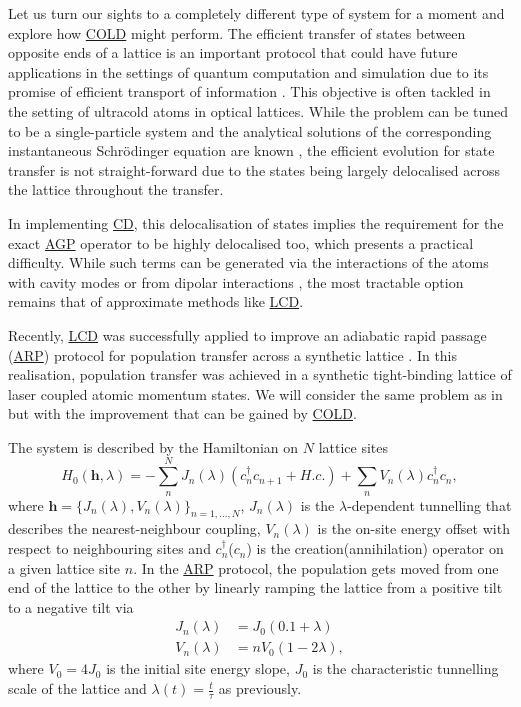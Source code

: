 \documentclass[a4paper,oneside,11pt]{book}
\newcommand{\hbb}{\boldsymbol{h}}
\newcommand{\acrref}[1]{\hyperref[acr:#1]{#1}}
\begin{document}
Let us turn our sights to a completely different type of system for a moment and explore how \acrref{COLD} might perform. The efficient transfer of states between opposite ends of a lattice is an important protocol that could have future applications in the settings of quantum computation and simulation due to its promise of efficient transport of information \cite{lang_topological_2017}. This objective is often tackled in the setting of ultracold atoms in optical lattices. While the problem can be tuned to be a single-particle system and the analytical solutions of the corresponding instantaneous Schr\"odinger equation are known \cite{hatsugai_chern_1993,hugel_chiral_2014}, the efficient evolution for state transfer is not straight-forward due to the states being largely delocalised across the lattice throughout the transfer. 

In implementing \acrref{CD}, this delocalisation of states implies the requirement for the exact \acrref{AGP} operator to be highly delocalised too, which presents a practical difficulty. While such terms can be generated via the interactions of the atoms with cavity modes \cite{landig_quantum_2016,keller_phases_2017} or from dipolar interactions \cite{baranov_ultracold_2002, trefzger_ultracold_2011}, the most tractable option remains that of approximate methods like \acrref{LCD}.

Recently, \acrref{LCD} was successfully applied to improve an adiabatic rapid passage (\acrref{ARP}) protocol for population transfer across a synthetic lattice \cite{meier_counterdiabatic_2020}. In this realisation, population transfer was achieved in a synthetic tight-binding lattice of laser coupled atomic momentum states. We will consider the same problem as in \cite{meier_counterdiabatic_2020} but with the improvement that can be gained by \acrref{COLD}. 

The system is described by the Hamiltonian on $N$ lattice sites
\begin{equation}\label{eq:lattice_hamiltonian}
    H_0(\hbb, \lambda) = - \sum_n^N J_n(\lambda)(c_n^{\dag}c_{n+1} + H.c.) + \sum_n V_n(\lambda) c_n^{\dag}c_n,
\end{equation}
where $\hbb = \{ J_n(\lambda), V_n(\lambda)\}_{n = 1, ..., N}$, $J_n(\lambda)$ is the $\lambda$-dependent tunnelling that describes the nearest-neighbour coupling, $V_n(\lambda)$ is the on-site energy offset with respect to neighbouring sites and $c_n^{\dag}$($c_{n}$) is the creation(annihilation) operator on a given lattice site $n$. In the \acrref{ARP} protocol, the population gets moved from one end of the lattice to the other by linearly ramping the lattice from a positive tilt to a negative tilt via
\begin{equation} \label{eq:J_lattice}
    \begin{aligned}
        J_n(\lambda) &= J_0(0.1 + \lambda) \\
        V_n(\lambda) &= n V_0 (1 - 2\lambda),
    \end{aligned}
\end{equation}
where $V_0 = 4J_0$ is the initial site energy slope, $J_0$ is the characteristic tunnelling scale of the lattice and $\lambda(t) = \frac{t}{\tau}$ as previously.
\end{document}
